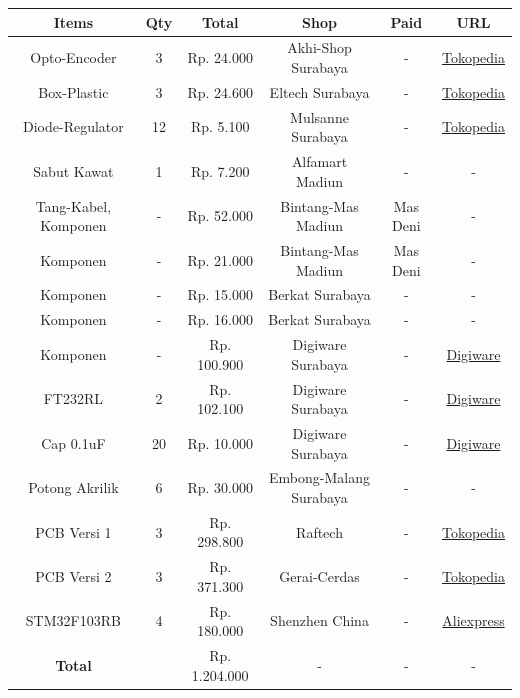 \documentclass{article} %
\begin{document}
	\begin{table}[H]
	\centering
	\begin{tabular}{|c|c|c|c|c|c|}
		\hline
		Items & Qty & Total & Shop & Paid & URL \\
		\hline
		Opto-Encoder & 3 & Rp. 24.000 & Akhi-Shop Surabaya &  - & \hyperlink{https://www.tokopedia.com/akhishop/opto-coupler-encoder-sensor-module}{Tokopedia} \\
		Box-Plastic & 3 & Rp. 24.600 & Eltech Surabaya & - & \hyperlink{https://www.tokopedia.com/eltech-online/box-electronic-instrument-project-plastic-03-15-cream-40x84x142mm}{Tokopedia} \\
		Diode-Regulator & 12 & Rp. 5.100 & Mulsanne Surabaya & - & \hyperlink{https://www.tokopedia.com/mulsanne/ic-ams1117-5-volt-step-down-smd-800ma}{Tokopedia} \\
		Sabut Kawat & 1 & Rp. 7.200 & Alfamart Madiun & - & - \\
		Tang-Kabel, Komponen & - & Rp. 52.000 & Bintang-Mas Madiun & Mas Deni & - \\
		Komponen & - & Rp. 21.000 & Bintang-Mas Madiun & Mas Deni & - \\
		Komponen & - & Rp. 15.000 & Berkat Surabaya & - & - \\
		Komponen & - & Rp. 16.000 & Berkat Surabaya & - & - \\
		Komponen & - & Rp. 100.900 & Digiware Surabaya & - & \hyperlink{https://digiwarestore.com/id/}{Digiware} \\
		FT232RL & 2 & Rp. 102.100 & Digiware Surabaya & - & \hyperlink{https://digiwarestore.com/id/serial-communication/ft232rl-166019.html}{Digiware} \\
		Cap 0.1uF & 20 & Rp. 10.000 & Digiware Surabaya & - & \hyperlink{https://digiwarestore.com/id/smd-capacitor/01uf-50v-10-0805-t-241110.html}{Digiware} \\
		Potong Akrilik & 6 & Rp. 30.000 & Embong-Malang Surabaya & - & - \\
		PCB Versi 1 & 3 & Rp. 298.800 & Raftech & - & \hyperlink{https://www.tokopedia.com/raftech/jasa-cetak-pcb-double-layer-fr4-full-masking-jalur-masking-silkscreen}{Tokopedia} \\
		PCB Versi 2 & 3 & Rp. 371.300 & Gerai-Cerdas & - & \hyperlink{https://www.tokopedia.com/geraicerdas/cetak-pcb-1-keping-single-double-layer-rapid-prototyping-satuan}{Tokopedia} \\
		STM32F103RB & 4 & Rp. 180.000 & Shenzhen China & - & \hyperlink{https://id.aliexpress.com/item/1005002651134172.html}{Aliexpress} \\
		\hline
		\textbf{Total} & & Rp. 1.204.000 & - & - & - \\
		\hline
	\end{tabular}
	\end{table}
\end{document}

